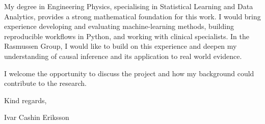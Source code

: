 \documentclass[11pt,a4paper]{moderncv}
\begin{document}
\vspace{4pt}
\hspace*{2em}
My degree in Engineering Physics, specialising in Statistical Learning and Data Analytics, provides a strong mathematical foundation for this work. I would bring experience developing and evaluating machine-learning methods, building reproducible workflows in Python, and working with clinical specialists. In the Rasmussen Group, I would like to build on this experience and deepen my understanding of causal inference and its application to real world evidence.

\vspace*{2em}
I welcome the opportunity to discuss the project and how my background could contribute to the research.

\vspace{2em}
Kind regards,

Ivar Cashin Eriksson
\end{document}
